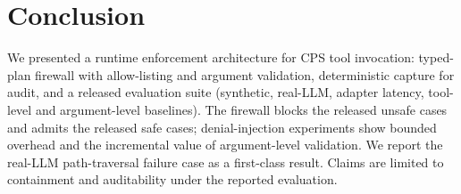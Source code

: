 \documentclass[sigconf]{acmart}
\begin{document}
\section{Conclusion}

We presented a runtime enforcement architecture for CPS tool invocation: typed-plan firewall with allow-listing and argument validation, deterministic capture for audit, and a released evaluation suite (synthetic, real-LLM, adapter latency, tool-level and argument-level baselines). The firewall blocks the released unsafe cases and admits the released safe cases; denial-injection experiments show bounded overhead and the incremental value of argument-level validation. We report the real-LLM path-traversal failure case as a first-class result. Claims are limited to containment and auditability under the reported evaluation.



\end{document}

